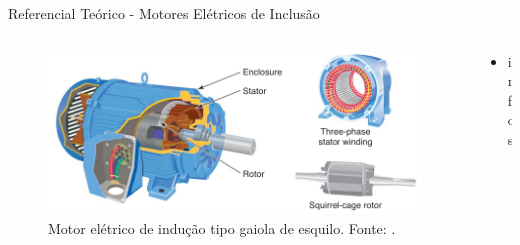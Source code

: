 \documentclass[aspectratio=169]{beamer}
\begin{document}
\begin{frame}{Referencial Teórico - Motores Elétricos de Inclusão}
	\begin{columns}
    	\begin{column}{0.50\textwidth}
			\begin{figure}[HT]
				\begin{center}
					\captionsetup{justification=justified}
					\includegraphics[scale=.3]{../referencial/img/ind_motor_petruzella_p115.png}
					\caption{Motor elétrico de indução tipo gaiola de esquilo. \newline
					Fonte: .}
					\label{fig:ind_motor_petruzella_p115}
				\end{center}
			\end{figure}
     	\end{column}
		
		\begin{column}{0.5\textwidth}
			\begin{itemize}
				\item infos
			\end{itemize}
	 	\end{column}
	 \end{columns}
\end{frame}

\end{document}
